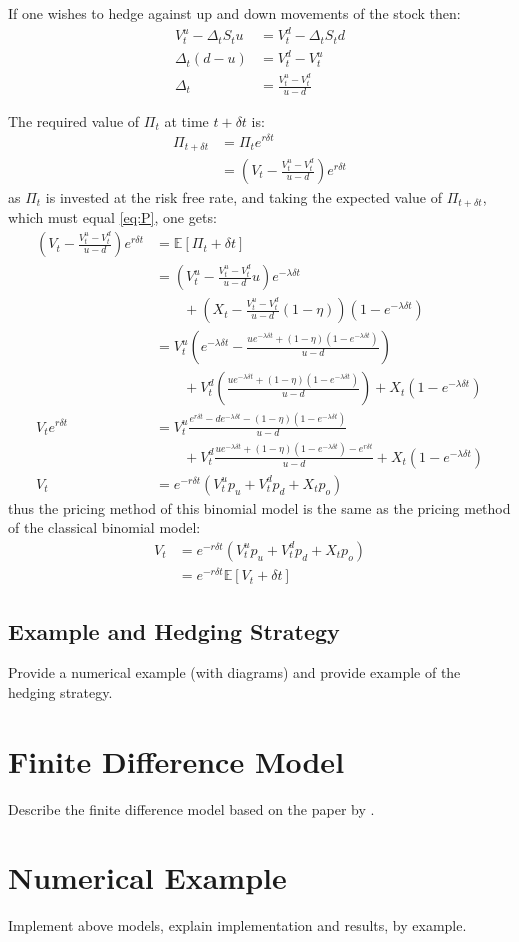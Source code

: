 \documentclass[a4paper,11pt,oneside]{report}
\theoremstyle{plain}
\theoremstyle{definition}
\def\n{\nonumber\\}
\def\E[#1]{\mathbb{E}\left[#1\right]}
\def\S{\ensuremath{S_t}\xspace}
\def\Dt{\ensuremath{\delta t}\xspace}
\def\u{\ensuremath{u}\xspace}
\def\d{\ensuremath{d}\xspace}
\def\o{\ensuremath{o}\xspace}
\def\pu{\ensuremath{p_\u}\xspace}
\def\pd{\ensuremath{p_\d}\xspace}
\def\po{\ensuremath{p_\o}\xspace}
\def\V{\ensuremath{V_t}\xspace}
\def\Vu{\ensuremath{V^{u}_t}\xspace}
\def\Vd{\ensuremath{V^{d}_t}\xspace}
\def\X{\ensuremath{X_t}\xspace}
\def\P{\ensuremath{\Pi_t}\xspace}
\def\D{\ensuremath{\Delta_t}\xspace}
\begin{document}
If one wishes to hedge against up and down movements of the stock then:
\begin{align}
    \Vu - \D\S u &= \Vd - \D\S d \n
       \D(d - u) &= \Vd - \Vu \n
              \D &= \frac{\Vu - \Vd}{u - d}
\end{align}

The required value of \P at time $t + \Dt$ is:
\begin{align}
 \Pi_{t + \Dt}  &= \P e^{r\Dt} \n
                &= \left(\V - \frac{\Vu - \Vd}{u - d}\right) e^{r\Dt} \label{eq:P}
\end{align}
as \P is invested at the risk free rate, and taking the expected value of $\Pi_{t + \Dt}$, which must equal \eqref{eq:P}, one gets:
\begin{align}
 (\V - \frac{\Vu - \Vd}{u - d}) e^{r\Dt} &= \E[\Pi_{t + \Dt}] \n
        &= \left(\Vu - \frac{\Vu - \Vd}{u - d}u\right) e^{-\lambda\Dt} \n
        &\qquad + \left(\X - \frac{\Vu - \Vd}{u - d}(1 - \eta)\right)(1 - e^{-\lambda\Dt}) \n
        &= \Vu\left(e^{-\lambda\Dt} - \frac{ue^{-\lambda\Dt} + (1 - \eta)(1 - e^{-\lambda\Dt})}{u - d}\right) \n
        &\qquad + \Vd\left(\frac{ue^{-\lambda\Dt} + (1 - \eta)(1 - e^{-\lambda\Dt})}{u - d}\right) + \X(1 - e^{-\lambda\Dt}) \n
 \V e^{r\Dt} &= \Vu\frac{e^{r\Dt} - de^{-\lambda\Dt} - (1 - \eta)(1 - e^{-\lambda\Dt})}{u - d} \n
        &\qquad + \Vd\frac{ue^{-\lambda\Dt} + (1 - \eta)(1 - e^{-\lambda\Dt}) - e^{r\Dt}}{u - d} + \X(1 - e^{-\lambda\Dt}) \n
 \V     &= e^{-r\Dt}(\Vu\pu + \Vd\pd + \X\po)
\end{align}
thus the pricing method of this binomial model is the same as the pricing method of the classical binomial model:
\begin{align}
 V_t    &= e^{-r\Dt}(\Vu\pu + \Vd\pd + \X\po) \n
        &= e^{-r\Dt}\E[V_{t + \Dt}]
\end{align}

\section{Example and Hedging Strategy}
Provide a numerical example (with diagrams) and provide example of the hedging strategy.

\chapter{Finite Difference Model}
Describe the finite difference model based on the paper by \citet{AFV03}.

\chapter{Numerical Example}
Implement above models, explain implementation and results, by example.
\end{document}
